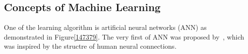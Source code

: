 \subsection{Concepts of Machine Learning}
One of the learning algorithm is artificial neural networks (ANN) as demonstrated in Figure\ref{147379}. The very first of ANN was proposed by~\citet{McCulloch_1943}, which was inspired by the structre of human neural connections. 